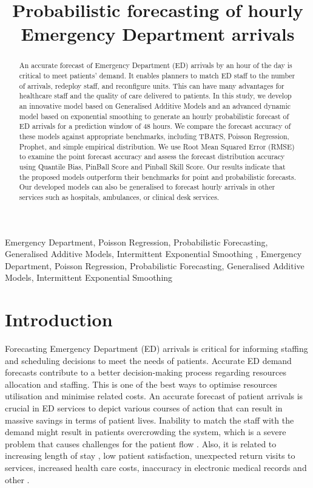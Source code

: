 \documentclass[]{elsarticle} %
\begin{document}
\begin{frontmatter}

  \title{Probabilistic forecasting of hourly Emergency Department arrivals}
  
  \begin{abstract}
  An accurate forecast of Emergency Department (ED) arrivals by an hour of the day is critical to meet patients' demand. It enables planners to match ED staff to the number of arrivals, redeploy staff, and reconfigure units. This can have many advantages for healthcare staff and the quality of care delivered to patients. In this study, we develop an innovative model based on Generalised Additive Models and an advanced dynamic model based on exponential smoothing to generate an hourly probabilistic forecast of ED arrivals for a prediction window of 48 hours. We compare the forecast accuracy of these models against appropriate benchmarks, including TBATS, Poisson Regression, Prophet, and simple empirical distribution. We use Root Mean Squared Error (RMSE) to examine the point forecast accuracy and assess the forecast distribution accuracy using Quantile Bias, PinBall Score and Pinball Skill Score. Our results indicate that the proposed models outperform their benchmarks for point and probabilistic forecasts. Our developed models can also be generalised to forecast hourly arrivals in other services such as hospitals, ambulances, or clinical desk services.
  \end{abstract}
    \begin{keyword}
    Emergency Department, Poisson Regression, Probabilistic Forecasting, Generalised Additive Models, Intermittent Exponential Smoothing \sep 
    Emergency Department, Poisson Regression, Probabilistic Forecasting, Generalised Additive Models, Intermittent Exponential Smoothing
  \end{keyword}
  
 \end{frontmatter}

\hypertarget{introduction}{%
\section{Introduction}\label{introduction}}

Forecasting Emergency Department (ED) arrivals is critical for informing
staffing and scheduling decisions to meet the needs of patients.
Accurate ED demand forecasts contribute to a better decision-making
process regarding resources allocation and staffing. This is one of the
best ways to optimise resources utilisation and minimise related costs.
An accurate forecast of patient arrivals is crucial in ED services to
depict various courses of action that can result in massive savings in
terms of patient lives. Inability to match the staff with the demand
might result in patients overcrowding the system, which is a severe
problem that causes challenges for the patient flow
\citep{derlet2002overcrowding}. Also, it is related to increasing length of
stay \citep{muhammet2015forecasting}, low patient satisfaction, unexpected
return visits to services, increased health care costs, inaccuracy in
electronic medical records and other \citep{ROSTAMITABAR20221197}.
\end{document}
